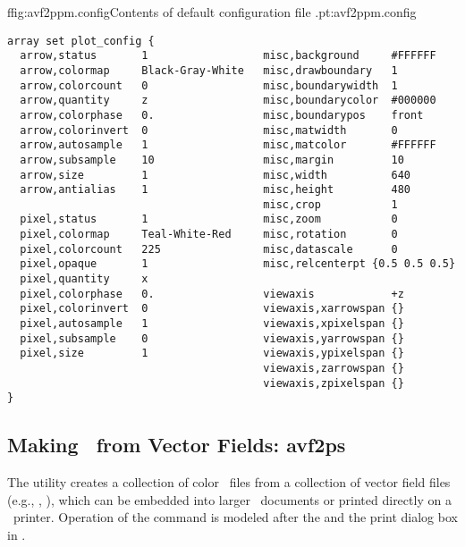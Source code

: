 \begin{codelisting}{f}{fig:avf2ppm.config}{Contents of default configuration
file .}{pt:avf2ppm.config}
\begin{verbatim}
array set plot_config {
  arrow,status       1                  misc,background     #FFFFFF
  arrow,colormap     Black-Gray-White   misc,drawboundary   1
  arrow,colorcount   0                  misc,boundarywidth  1
  arrow,quantity     z                  misc,boundarycolor  #000000
  arrow,colorphase   0.                 misc,boundarypos    front
  arrow,colorinvert  0                  misc,matwidth       0
  arrow,autosample   1                  misc,matcolor       #FFFFFF
  arrow,subsample    10                 misc,margin         10
  arrow,size         1                  misc,width          640
  arrow,antialias    1                  misc,height         480
                                        misc,crop           1
  pixel,status       1                  misc,zoom           0
  pixel,colormap     Teal-White-Red     misc,rotation       0
  pixel,colorcount   225                misc,datascale      0
  pixel,opaque       1                  misc,relcenterpt {0.5 0.5 0.5}
  pixel,quantity     x
  pixel,colorphase   0.                 viewaxis            +z
  pixel,colorinvert  0                  viewaxis,xarrowspan {}
  pixel,autosample   1                  viewaxis,xpixelspan {}
  pixel,subsample    0                  viewaxis,yarrowspan {}
  pixel,size         1                  viewaxis,ypixelspan {}
                                        viewaxis,zarrowspan {}
                                        viewaxis,zpixelspan {}
}
\end{verbatim}
\end{codelisting}


\subsection{Making \postscript\ from Vector Fields:
            avf2ps}\label{sec:avf2ps}%

The  utility creates a
collection of color \eps\ files from a collection of
vector field files (e.g., , ), which can be embedded
into larger \postscript\ documents or printed directly on a \postscript\
printer.  Operation of the  command is modeled after the
{} and the print
dialog box in {}.

